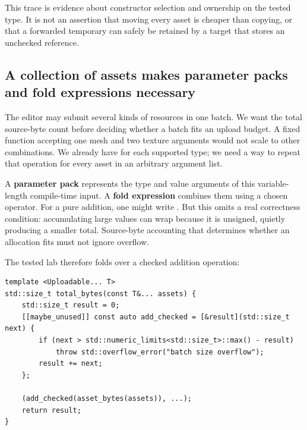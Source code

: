 This trace is evidence about constructor selection and ownership on the tested type. It is not an assertion that moving every asset is cheaper than copying, or that a forwarded temporary can safely be retained by a target that stores an unchecked reference.

\subsection{A collection of assets makes parameter packs and fold expressions necessary}\label{05-engine-i-ch005-a-collection-of-assets-makes-parameter-packs-and-fold-expressions-necessary}

\hypertarget{05-engine-i-ch005-a-collection-of-assets-makes-parameter-packs-and-fold-expressions-necessary}{}

The editor may submit several kinds of resources in one batch. We want the total source-byte count before deciding whether a batch fits an upload budget. A fixed function accepting one mesh and two texture arguments would not scale to other combinations. We already have  for each supported type; we need a way to repeat that operation for every asset in an arbitrary argument list.

A \textbf{parameter pack} represents the type and value arguments of this variable-length compile-time input. A \textbf{fold expression} combines them using a chosen operator. For a pure addition, one might write . But this omits a real correctness condition: accumulating large  values can wrap because it is unsigned, quietly producing a smaller total. Source-byte accounting that determines whether an allocation fits must not ignore overflow.

The tested lab therefore folds over a checked addition operation:

\begin{verbatim}
template <Uploadable... T>
std::size_t total_bytes(const T&... assets) {
    std::size_t result = 0;
    [[maybe_unused]] const auto add_checked = [&result](std::size_t next) {
        if (next > std::numeric_limits<std::size_t>::max() - result)
            throw std::overflow_error("batch size overflow");
        result += next;
    };

    (add_checked(asset_bytes(assets)), ...);
    return result;
}
\end{verbatim}

